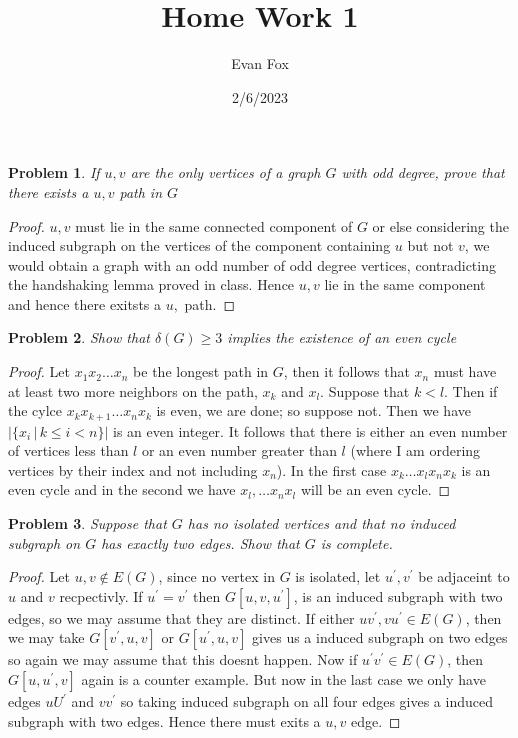 \documentclass{article}
\title{Home Work 1}
\author{Evan Fox}
\date{2/6/2023}
\newtheorem{prb}{Problem}
\begin{document}
 

\maketitle
\begin{prb} 
If $u,v$ are the only vertices of a graph $G$ with odd degree, prove that there exists a $u,v$ path in $G$
\end{prb} 
\begin{proof} 
$u,v$ must lie in the same connected component of $G$ or else considering the induced subgraph on the vertices of the component containing $u$ but not $v$, we would obtain a graph with an odd number of odd degree vertices, contradicting the handshaking lemma proved in class. Hence $u,v$ lie in the same component and hence there exitsts a $u,$ path. 
\end{proof}

\begin{prb}
Show that $\delta(G) \geq 3$ implies the existence of an even cycle
\end{prb} 

\begin{proof} 
Let $x_1 x_2 \dots x_n$ be the longest path in $G$, then it follows that $x_n$ must have at least two more neighbors on the path, $x_k$ and $x_l$. 
Suppose that $k < l$. Then if the cylce $x_k x_{k+1} \dots x_n x_k$ is even, we are done; so suppose not. Then we have 
$|\{ x_i\, | \, k \leq i < n \}|$ is an even integer. It follows that there is either an even number of vertices less than $l$ or an even number 
greater than $l$ (where I am ordering vertices by their index and not including $x_n$). In the first case $x_k \dots x_l x_n x_k$ is an even cycle and 
in the second we have $x_l, \dots x_n x_l$ will be an even cycle.  
\end{proof}

\newpage

\begin{prb} 
Suppose that $G$ has no isolated vertices and that no induced subgraph on $G$ has exactly two edges. Show that $G$ is complete. 
\end{prb}

\begin{proof} 
	Let $u, v \notin E(G)$, since no vertex in $G$ is isolated, let $u^\prime, v^\prime$ be adjaceint to $u$ and $v$ recpectivly. If $u^\prime = v^\prime$ then $G[u, v, u^\prime]$, is an induced subgraph with two edges, so we may assume that they are distinct. If either $uv^\prime, vu^\prime \in E(G)$, then we may take $G[v^\prime, u, v]$ or $G[u^\prime, u, v]$ gives us a induced subgraph on two edges so again we may assume that this doesnt happen. Now if $u^\prime v^\prime \in E(G)$, then $G[u, u^\prime, v]$ again is a counter example. But now in the last case we only have edges $u U^\prime$ and $v v^\prime$ so taking induced subgraph on all four edges gives a induced subgraph with two edges. Hence there must exits a $u, v$ edge.
\end{proof}
\newpage
\end{document}
